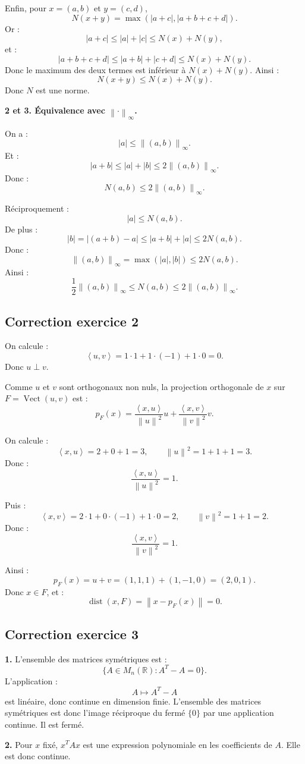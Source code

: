 \documentclass[11pt,a4paper]{article}
\newcommand{\R}{\mathbb R}
\newcommand{\norme}[1]{\left\lVert #1 \right\rVert}
\newcommand{\scal}[2]{\left\langle #1,#2\right\rangle}
\newcommand{\dist}{\operatorname{dist}}
\newcommand{\Vect}{\operatorname{Vect}}
\begin{document}
Enfin, pour \(x=(a,b)\) et \(y=(c,d)\),
\[
N(x+y)=\max(|a+c|,|a+b+c+d|).
\]
Or :
\[
|a+c|\leq |a|+|c|\leq N(x)+N(y),
\]
et :
\[
|a+b+c+d|\leq |a+b|+|c+d|\leq N(x)+N(y).
\]
Donc le maximum des deux termes est inférieur à \(N(x)+N(y)\).  
Ainsi :
\[
N(x+y)\leq N(x)+N(y).
\]
Donc \(N\) est une norme.

\textbf{2 et 3. Équivalence avec \(\norme{\cdot}_\infty\).}

On a :
\[
|a|\leq \norme{(a,b)}_\infty.
\]
Et :
\[
|a+b|\leq |a|+|b|\leq 2\norme{(a,b)}_\infty.
\]
Donc :
\[
N(a,b)\leq 2\norme{(a,b)}_\infty.
\]

Réciproquement :
\[
|a|\leq N(a,b).
\]
De plus :
\[
|b|=|(a+b)-a|\leq |a+b|+|a|\leq 2N(a,b).
\]
Donc :
\[
\norme{(a,b)}_\infty=\max(|a|,|b|)\leq 2N(a,b).
\]
Ainsi :
\[
\frac12\norme{(a,b)}_\infty\leq N(a,b)\leq 2\norme{(a,b)}_\infty.
\]

\subsection*{Correction exercice 2}

On calcule :
\[
\scal{u}{v}=1\cdot1+1\cdot(-1)+1\cdot0=0.
\]
Donc \(u\perp v\).

Comme \(u\) et \(v\) sont orthogonaux non nuls, la projection orthogonale de \(x\) sur \(F=\Vect(u,v)\) est :
\[
p_F(x)=\frac{\scal{x}{u}}{\norme{u}^2}u+
\frac{\scal{x}{v}}{\norme{v}^2}v.
\]

On calcule :
\[
\scal{x}{u}=2+0+1=3,
\qquad
\norme{u}^2=1+1+1=3.
\]
Donc :
\[
\frac{\scal{x}{u}}{\norme{u}^2}=1.
\]

Puis :
\[
\scal{x}{v}=2\cdot1+0\cdot(-1)+1\cdot0=2,
\qquad
\norme{v}^2=1+1=2.
\]
Donc :
\[
\frac{\scal{x}{v}}{\norme{v}^2}=1.
\]

Ainsi :
\[
p_F(x)=u+v=(1,1,1)+(1,-1,0)=(2,0,1).
\]
Donc \(x\in F\), et :
\[
\dist(x,F)=\norme{x-p_F(x)}=0.
\]

\subsection*{Correction exercice 3}

\textbf{1.}  
L'ensemble des matrices symétriques est :
\[
\{A\in M_n(\R): A^T-A=0\}.
\]
L'application :
\[
A\mapsto A^T-A
\]
est linéaire, donc continue en dimension finie.  
L'ensemble des matrices symétriques est donc l'image réciproque du fermé \(\{0\}\) par une application continue. Il est fermé.

\textbf{2.}  
Pour \(x\) fixé, \(x^TAx\) est une expression polynomiale en les coefficients de \(A\).  
Elle est donc continue.
\end{document}
